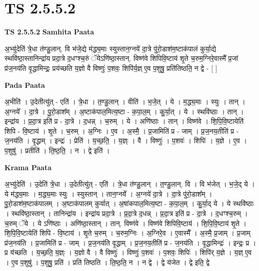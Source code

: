 \documentclass[17pt]{extarticle}
\begin{document}
\section{ TS 2.5.5.2 }

\textbf{TS 2.5.5.2 } \newline
\textbf{Samhita Paata} \newline

अ॒भ्यु॑देति॑ त्रे॒धा त॑ण्डु॒लान्. वि भ॑जे॒द्ये म॑द्ध्य॒माः स्युस्तान॒ग्नये॑ दा॒त्रे पु॑रो॒डाश॑म॒ष्टाक॑पालं कुर्या॒द्ये स्थवि॑ष्ठा॒स्तानिन्द्रा॑य प्रदा॒त्रे द॒धꣳश्च॒रुं ॅयेऽणि॑ष्ठा॒स्तान्. विष्ण॑वे शिपिवि॒ष्टाय॑ शृ॒ते च॒रुम॒ग्निरे॒वास्मै᳚ प्र॒जां प्र॑ज॒नय॑ति वृ॒द्धामिन्द्रः॒ प्रय॑च्छति य॒ज्ञो वै विष्णुः॑ प॒शवः॒ शिपि॑र्य॒ज्ञ् ए॒व प॒शुषु॒ प्रति॑तिष्ठति॒ न द्वे - [  ] \newline

\textbf{Pada Paata} \newline

अ॒भीति॑ । उ॒देतीत्यु॑त् - एति॑ । त्रे॒धा । त॒ण्डु॒लान् । वीति॑ । भ॒जे॒त् । ये । म॒द्ध्य॒माः । स्युः । तान् । अ॒ग्नये᳚ । दा॒त्रे । पु॒रो॒डाश᳚म् । अ॒ष्टाक॑पाल॒मित्य॒ष्टा - क॒पा॒ल॒म् । कु॒र्या॒त् । ये । स्थवि॑ष्ठाः । तान् । इन्द्रा॑य । प्र॒दा॒त्र इति॑ प्र - दा॒त्रे । द॒धन्न् । च॒रुम् । ये । अणि॑ष्ठाः । तान् । विष्ण॑वे । शि॒पि॒वि॒ष्टायेति॑ शिपि - वि॒ष्टाय॑ । शृ॒ते । च॒रुम् । अ॒ग्निः । ए॒व । अ॒स्मै॒ । प्र॒जामिति॑ प्र - जाम् । प्र॒ज॒नय॒तीति॑ प्र - ज॒नय॑ति । वृ॒द्धाम् । इन्द्रः॑ । प्रेति॑ । य॒च्छ॒ति॒ । य॒ज्ञ्ः । वै । विष्णुः॑ । प॒शवः॑ । शिपिः॑ । य॒ज्ञे । ए॒व । प॒शुषु॑ । प्रतीति॑ । ति॒ष्ठ॒ति॒ । न । द्वे इति॑ ।  \newline


\textbf{Krama Paata} \newline

अ॒भ्यु॑देति॑ । उ॒देति॑ त्रे॒धा । उ॒देतीत्यु॑त् - एति॑ । त्रे॒धा त॑ण्डु॒लान् । त॒ण्डु॒लान्. वि । वि भ॑जेत् । भ॒जे॒द् ये । ये म॑द्ध्य॒माः । म॒द्ध्य॒माः स्युः । स्युस्तान् । तान॒ग्नये᳚ । अ॒ग्नये॑ दा॒त्रे । दा॒त्रे पु॑रो॒डाश᳚म् । पु॒रो॒डाश॑म॒ष्टाक॑पालम् । अ॒ष्टाक॑पालम् कुर्यात् । अ॒षा॑कपाल॒मित्य॒ष्टा - क॒पा॒ल॒म् । कु॒र्या॒द् ये । ये स्थवि॑ष्ठाः । स्थवि॑ष्ठा॒स्तान् । तानिन्द्रा॑य । इन्द्रा॑य प्रदा॒त्रे । प्र॒दा॒त्रे द॒धन्न् । प्र॒दा॒त्र इति॑ प्र - दा॒त्रे । द॒धꣳश्च॒रुम् । च॒रुम् ॅये । ये ऽणि॑ष्ठाः । अणि॑ष्ठा॒स्तान् । तान्. विष्ण॑वे । विष्ण॑वे शिपिवि॒ष्टाय॑ । शि॒पि॒वि॒ष्टाय॑ शृ॒ते । शि॒पि॒वि॒ष्टायेति॑ शिपि - वि॒ष्टाय॑ । शृ॒ते च॒रुम् । च॒रुम॒ग्निः । अ॒ग्निरे॒व । ए॒वास्मै᳚ । अ॒स्मै॒ प्र॒जाम् । प्र॒जाम् प्र॑ज॒नय॑ति । प्र॒जामिति॑ प्र - जाम् । प्र॒ज॒नय॑ति वृ॒द्धाम् । प्र॒ज॒नय॒तीति॑ प्र - ज॒नय॑ति । वृ॒द्धामिन्द्रः॑ । इन्द्रः॒ प्र । प्र य॑च्छति । य॒च्छ॒ति॒ य॒ज्ञ्ः । य॒ज्ञो वै । वै विष्णुः॑ । विष्णुः॑ प॒शवः॑ । प॒शवः॒ शिपिः॑ । शिपि॑र् य॒ज्ञे । य॒ज्ञ् ए॒व । ए॒व प॒शुषु॑ । प॒शुषु॒ प्रति॑ । प्रति॑ तिष्ठति । ति॒ष्ठ॒ति॒ न । न द्वे । द्वे य॑जेत । द्वे इति॒ द्वे \newline
\end{document}
